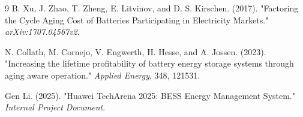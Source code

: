 \documentclass[11pt, a4paper]{article}
\begin{document}
\begin{thebibliography}{9}
    B. Xu, J. Zhao, T. Zheng, E. Litvinov, and D. S. Kirschen. (2017). "Factoring the Cycle Aging Cost of Batteries Participating in Electricity Markets." \textit{arXiv:1707.04567v2}.
    
    N. Collath, M. Cornejo, V. Engwerth, H. Hesse, and A. Jossen. (2023). "Increasing the lifetime profitability of battery energy storage systems through aging aware operation." \textit{Applied Energy}, 348, 121531.
    
    Gen Li. (2025). "Huawei TechArena 2025: BESS Energy Management System." \textit{Internal Project Document}.
\end{thebibliography}
\end{document}
